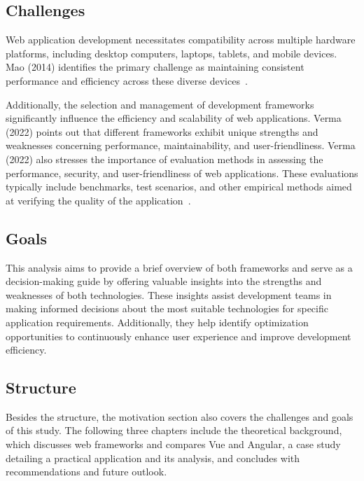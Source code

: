 \documentclass[conference]{IEEEtran}
\begin{document}
\subsection{Challenges}

Web application development necessitates compatibility across multiple hardware platforms, including desktop computers, laptops, tablets, and mobile devices. Mao (2014) identifies the primary challenge as maintaining consistent performance and efficiency across these diverse devices~\cite{mao2014developing}.

Additionally, the selection and management of development frameworks significantly influence the efficiency and scalability of web applications. Verma (2022) points out that different frameworks exhibit unique strengths and weaknesses concerning performance, maintainability, and user-friendliness. Verma (2022) also stresses the importance of evaluation methods in assessing the performance, security, and user-friendliness of web applications. These evaluations typically include benchmarks, test scenarios, and other empirical methods aimed at verifying the quality of the application~\cite{verma2022comparison}.
\newline
\subsection{Goals}
This analysis aims to provide a brief overview of both frameworks and serve as a decision-making guide by offering valuable insights into the strengths and weaknesses of both technologies. 
These insights assist development teams in making informed decisions about the most suitable technologies for specific application requirements. Additionally, they help identify optimization opportunities to continuously enhance user experience and improve development efficiency.
\newline
\subsection{Structure}
Besides the structure, the motivation section also covers the challenges and goals of this study. The following three chapters include the theoretical background, which discusses web frameworks and compares Vue and Angular, a case study detailing a practical application and its analysis, and concludes with recommendations and future outlook.
\newline
\end{document}
